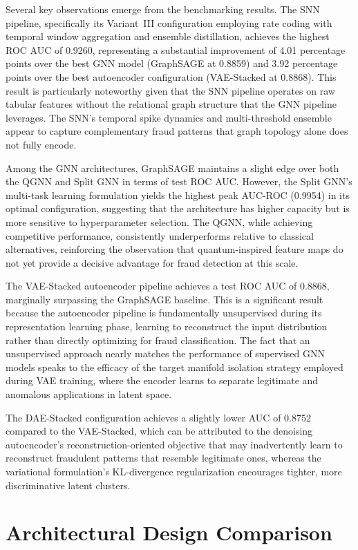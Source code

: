 Several key observations emerge from the benchmarking results. The SNN pipeline, specifically its Variant~III configuration employing rate coding with temporal window aggregation and ensemble distillation, achieves the highest ROC AUC of 0.9260, representing a substantial improvement of 4.01 percentage points over the best GNN model (GraphSAGE at 0.8859) and 3.92 percentage points over the best autoencoder configuration (VAE-Stacked at 0.8868). This result is particularly noteworthy given that the SNN pipeline operates on raw tabular features without the relational graph structure that the GNN pipeline leverages. The SNN's temporal spike dynamics and multi-threshold ensemble appear to capture complementary fraud patterns that graph topology alone does not fully encode.

Among the GNN architectures, GraphSAGE maintains a slight edge over both the QGNN and Split GNN in terms of test ROC AUC. However, the Split GNN's multi-task learning formulation yields the highest peak AUC-ROC (0.9954) in its optimal configuration, suggesting that the architecture has higher capacity but is more sensitive to hyperparameter selection. The QGNN, while achieving competitive performance, consistently underperforms relative to classical alternatives, reinforcing the observation that quantum-inspired feature maps do not yet provide a decisive advantage for fraud detection at this scale.

The VAE-Stacked autoencoder pipeline achieves a test ROC AUC of 0.8868, marginally surpassing the GraphSAGE baseline. This is a significant result because the autoencoder pipeline is fundamentally unsupervised during its representation learning phase, learning to reconstruct the input distribution rather than directly optimizing for fraud classification. The fact that an unsupervised approach nearly matches the performance of supervised GNN models speaks to the efficacy of the target manifold isolation strategy employed during VAE training, where the encoder learns to separate legitimate and anomalous applications in latent space.

The DAE-Stacked configuration achieves a slightly lower AUC of 0.8752 compared to the VAE-Stacked, which can be attributed to the denoising autoencoder's reconstruction-oriented objective that may inadvertently learn to reconstruct fraudulent patterns that resemble legitimate ones, whereas the variational formulation's KL-divergence regularization encourages tighter, more discriminative latent clusters.

\section{Architectural Design Comparison}

